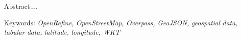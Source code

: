 \lipsum[1-3]

Abstract....\\
\newline

Keywords: \textit{OpenRefine, OpenStreetMap, Overpass, GeoJSON, geospatial data, tabular data, latitude, longitude, WKT}